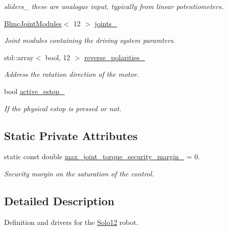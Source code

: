 \begin{DoxyCompactItemize}
\begin{DoxyCompactList}\small\item\em sliders\+\_\+ these are analogue input, typically from linear potentiometers. \end{DoxyCompactList}\item 
\mbox{\label{classblmc__robots_1_1Solo12_a1949ee20f0762be56a0020af1cf5727a}} 
\hyperlink{classblmc__robots_1_1BlmcJointModules}{Blmc\+Joint\+Modules}$<$ 12 $>$ \hyperlink{classblmc__robots_1_1Solo12_a1949ee20f0762be56a0020af1cf5727a}{joints\+\_\+}
\begin{DoxyCompactList}\small\item\em Joint modules containing the driving system paramters. \end{DoxyCompactList}\item 
std\+::array$<$ bool, 12 $>$ \hyperlink{classblmc__robots_1_1Solo12_ace2b1af72676f4ec2d285f6166ba6922}{reverse\+\_\+polarities\+\_\+}
\begin{DoxyCompactList}\small\item\em Address the rotation direction of the motor. \end{DoxyCompactList}\item 
bool \hyperlink{classblmc__robots_1_1Solo12_a9e28ceac427c283b4e66a1bde15baed8}{active\+\_\+estop\+\_\+}
\begin{DoxyCompactList}\small\item\em If the physical estop is pressed or not. \end{DoxyCompactList}\end{DoxyCompactItemize}
\subsection*{Static Private Attributes}
\begin{DoxyCompactItemize}
\item 
static const double \hyperlink{classblmc__robots_1_1Solo12_a7e83448a46ffc61cc70e4b82883ee113}{max\+\_\+joint\+\_\+torque\+\_\+security\+\_\+margin\+\_\+} = 0.
\begin{DoxyCompactList}\small\item\em Security margin on the saturation of the control. \end{DoxyCompactList}\end{DoxyCompactItemize}


\subsection{Detailed Description}
Definition and drivers for the \hyperlink{classblmc__robots_1_1Solo12}{Solo12} robot. 


